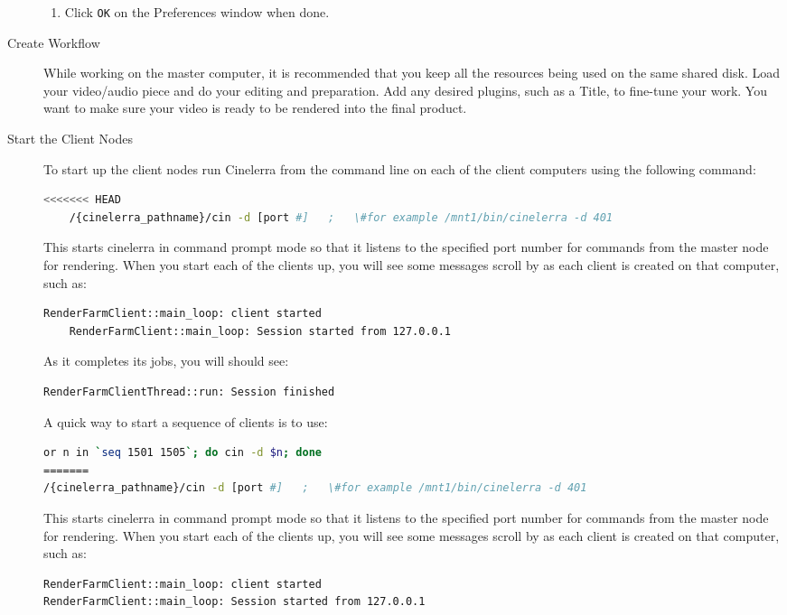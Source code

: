 \begin{description}
\begin{enumerate}
        \item Click \texttt{OK} on the Preferences window when done.
    \end{enumerate}
    \item[Create Workflow] While working on the master computer, it is recommended that you keep all the resources being used on the same shared disk.  Load your video/audio piece and do your editing and preparation.  Add any desired plugins, such as a Title, to fine-tune your work.  You want to make sure your video is ready to be rendered into the final product.
    \item[Start the Client Nodes] To start up the client nodes run Cinelerra from the command line on each of the client computers using the following command:
    \begin{lstlisting}[language=bash]
<<<<<<< HEAD
    /{cinelerra_pathname}/cin -d [port #]   ;   \#for example /mnt1/bin/cinelerra -d 401
    \end{lstlisting}
    This starts cinelerra in command prompt mode so that it listens to the specified port number for commands from the master node for rendering.  When you start each of the clients up, you will see some messages scroll by as each client is created on that computer, such as:
    \begin{lstlisting}[language=bash]
    RenderFarmClient::main_loop: client started
    RenderFarmClient::main_loop: Session started from 127.0.0.1
    \end{lstlisting}
    As it completes its jobs, you will should see:
    \begin{lstlisting}[language=bash]
    RenderFarmClientThread::run: Session finished
    \end{lstlisting}
    A quick way to start a sequence of clients is to use:
    \begin{lstlisting}[language=bash]
    or n in `seq 1501 1505`; do cin -d $n; done
=======
/{cinelerra_pathname}/cin -d [port #]   ;   \#for example /mnt1/bin/cinelerra -d 401
    \end{lstlisting}
    This starts cinelerra in command prompt mode so that it listens to the specified port number for commands from the master node for rendering.  When you start each of the clients up, you will see some messages scroll by as each client is created on that computer, such as:
    \begin{lstlisting}[language=bash]
RenderFarmClient::main_loop: client started
RenderFarmClient::main_loop: Session started from 127.0.0.1
    \end{lstlisting}

\end{description}
